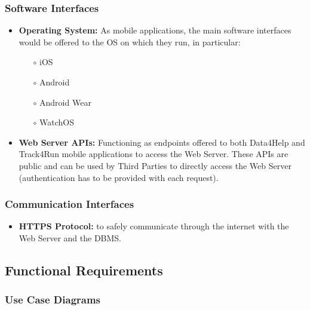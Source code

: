 \documentclass[titlepage]{article}
\begin{document}
		\subsubsection{Software Interfaces}
		\begin{itemize}
			\item{\bf Operating System: } As mobile applications, the main software interfaces would be offered to the OS on which they run, in particular:
			\begin{itemize}
				\item[$\circ$] iOS
				\item[$\circ$]Android
				\item[$\circ$] Android Wear
				\item[$\circ$] WatchOS
			\end{itemize}
			\item{\bf Web Server APIs: } Functioning as endpoints offered to both Data4Help and Track4Run mobile applications to access the Web Server.
These APIs are public and can be used by Third Parties to directly access the Web Server (authentication has to be provided with each request).

		\end{itemize}
			
		\subsubsection{Communication Interfaces}
		\begin{itemize}
			\item {\bf HTTPS Protocol:} to safely communicate through the internet with the Web Server and the DBMS.

		\end{itemize}

	\subsection{Functional Requirements}
			
		\subsubsection{Use Case Diagrams}
			
\end{document}
